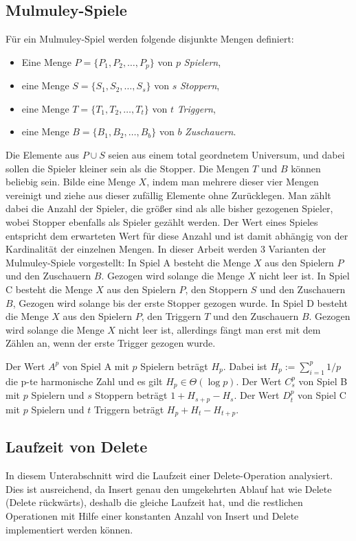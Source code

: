 \documentclass[a4paper]{scrreprt}
\theoremstyle{definition}
\begin{document}
\subsection{Mulmuley-Spiele}
\label{sec:mulmuley}
Für ein Mulmuley-Spiel werden folgende disjunkte Mengen definiert: %
\begin{itemize}
    \item Eine Menge $P = \{P_1, P_2, \dots, P_p\}$ von $p$ \emph{Spielern},
    \item eine Menge $S = \{S_1, S_2, \dots, S_s\}$ von $s$ \emph{Stoppern},
    \item eine Menge $T = \{T_1, T_2, \dots, T_t\}$ von $t$ \emph{Triggern},
    \item eine Menge $B = \{B_1, B_2, \dots, B_b\}$ von $b$ \emph{Zuschauern}.
\end{itemize}
Die Elemente aus $P \cup S$ seien aus einem total geordnetem Universum, und dabei sollen die Spieler kleiner sein als die Stopper.
Die Mengen $T$ und $B$ können beliebig sein.
Bilde eine Menge $X$, indem man mehrere dieser vier Mengen vereinigt und ziehe aus dieser zufällig Elemente ohne Zurücklegen.
Man zählt dabei die Anzahl der Spieler, die größer sind als alle bisher gezogenen Spieler, wobei Stopper ebenfalls als Spieler gezählt werden.
Der Wert eines Spieles entspricht dem erwarteten Wert für diese Anzahl und ist damit abhängig von der Kardinalität der einzelnen Mengen.
In dieser Arbeit werden 3 Varianten der Mulmuley-Spiele vorgestellt:
In Spiel A besteht die Menge $X$ aus den Spielern $P$ und den Zuschauern $B$.
Gezogen wird solange die Menge $X$ nicht leer ist.
In Spiel C besteht die Menge $X$ aus den Spielern $P$, den Stoppern $S$ und den Zuschauern $B$,
Gezogen wird solange bis der erste Stopper gezogen wurde.
In Spiel D besteht die Menge $X$ aus den Spielern $P$, den Triggern $T$ und den Zuschauern $B$.
Gezogen wird solange die Menge $X$ nicht leer ist, allerdings fängt man erst mit dem Zählen an, wenn der erste Trigger gezogen wurde.

Der Wert $A^p$ von Spiel A mit $p$ Spielern beträgt $H_p$. %
Dabei ist $H_p := \sum_{i=1}^p 1/p$ die p-te harmonische Zahl und es gilt $H_p \in \Theta(\log p)$. %
Der Wert $C_s^p$ von Spiel B mit $p$ Spielern und $s$ Stoppern beträgt $1 + H_{s+p} - H_s$.
Der  Wert $D_t^p$ von Spiel C mit $p$ Spielern und $t$ Triggern beträgt $H_p + H_t - H_{t+p}$.

\subsection{Laufzeit von Delete}
\label{sec:delruntime}
In diesem Unterabschnitt wird die Laufzeit einer Delete-Operation analysiert.
Dies ist ausreichend, da Insert genau den umgekehrten Ablauf hat wie Delete (\glqq Delete rückwärts\grqq), deshalb die gleiche Laufzeit hat, und die restlichen Operationen mit Hilfe einer konstanten Anzahl von Insert und Delete implementiert werden können. %
\end{document}
